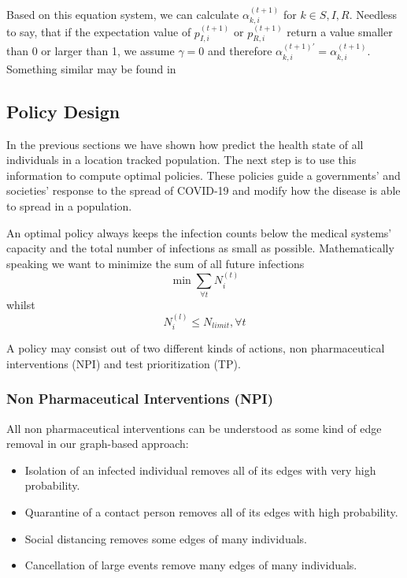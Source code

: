 Based on this equation system, we can calculate $\alpha_{k,i}^{(t+1)}$ for $k\in{S,I,R}$. Needless to say, that if the expectation value of $p_{I,i}^{(t+1)}$ or $p_{R,i}^{(t+1)}$ return a value smaller than 0 or larger than 1, we assume $\gamma=0$ and therefore $\alpha_{k,i}^{(t+1)\prime}=\alpha_{k,i}^{(t+1)}$. Something similar may be found in \cite{stojanovic2019bayesian}



\subsection{Policy Design}
In the previous sections we have shown how predict the health state of all individuals in a location tracked population.
The next step is to use this information to compute optimal policies.
These policies guide a governments' and societies' response to the spread of COVID-19 and modify how the disease is able to spread in a population.

An optimal policy always keeps the infection counts below the medical systems' capacity and the total number of infections as small as possible.
Mathematically speaking we want to minimize the sum of all future infections
\begin{equation}\label{eq:number-of-infected}
	\min \sum_{\forall t} N^{(t)}_i
\end{equation}
whilst
\begin{equation}\label{eq:cap-constraint}
	N^{(l)}_i \leq N_{limit}, \forall t
\end{equation}

A policy may consist out of two different kinds of actions, non pharmaceutical interventions (NPI) and test prioritization (TP).


\subsubsection{Non Pharmaceutical Interventions (NPI)}
All non pharmaceutical interventions can be understood as some kind of edge removal in our graph-based approach:
\begin{itemize}
	\item Isolation of an infected individual removes all of its edges with very high probability.
	\item Quarantine of a contact person removes all of its edges with high probability.
	\item Social distancing removes some edges of many individuals.
	\item Cancellation of large events remove many edges of many individuals.
\end{itemize}

